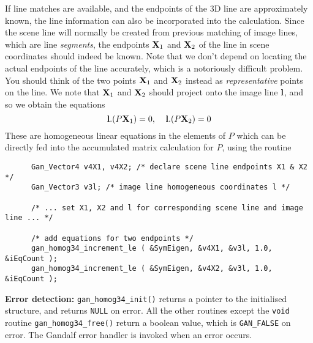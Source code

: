 If line matches are available, and the endpoints of the 3D line are
approximately known, the line information can also be incorporated into
the calculation. Since the scene line will normally be created from previous
matching of image lines, which are line {\em segments}, the endpoints
${\bf X}_1$ and ${\bf X}_2$ of the line in scene coordinates should indeed be
known. Note that we don't depend on locating the actual endpoints of the line
accurately, which is a notoriously difficult problem. You should think of
the two points ${\bf X}_1$ and ${\bf X}_2$ instead as {\em representative}
points on the line. We note that ${\bf X}_1$ and ${\bf X}_2$ should project
onto the image line ${\bf l}$, and so we obtain the equations
\[ {\bf l}.(P{\bf X}_1) = 0,\;\;\;\;{\bf l}.(P{\bf X}_2) = 0
\]
These are homogeneous linear equations in the elements of $P$
which can be directly fed into the
accumulated matrix calculation for $P$, using the routine
\begin{verbatim}
      Gan_Vector4 v4X1, v4X2; /* declare scene line endpoints X1 & X2 */
      Gan_Vector3 v3l; /* image line homogeneous coordinates l */

      /* ... set X1, X2 and l for corresponding scene line and image line ... */

      /* add equations for two endpoints */
      gan_homog34_increment_le ( &SymEigen, &v4X1, &v3l, 1.0, &iEqCount );
      gan_homog34_increment_le ( &SymEigen, &v4X2, &v3l, 1.0, &iEqCount );
\end{verbatim}

{\bf Error detection:} {\tt gan\_homog34\_init()} returns a pointer to
the initialised structure, and returns {\tt NULL} on error.
All the other routines except the {\tt void} routine {\tt gan\_homog34\_free()}
return a boolean value, which is {\tt GAN\_FALSE} on error.
The Gandalf error handler is invoked when an error occurs.

